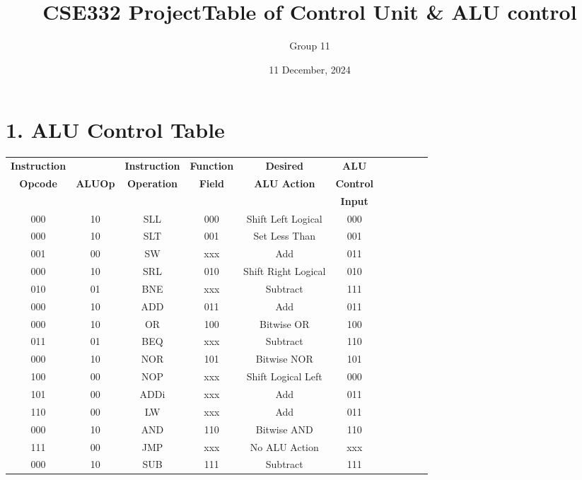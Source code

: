 \documentclass[12pt, onecolumn]{report}
\title{CSE332 Project}
\author{Group 11}
\date{11 December, 2024}
\begin{document}
\maketitle

\hfill

\begin{center}
  \title{\LARGE Table of Control Unit \& ALU control}  
\end{center}

\section*{1. ALU Control Table}

\begin{table}[h!]
\centering
\begin{tabular}{|c|c|c|c|c|c|c|c|c|c|c|}
\hline
\textbf{Instruction} & & \textbf{Instruction} & \textbf{Function} & \textbf{Desired} & \textbf{ALU} \\

\textbf{Opcode} & \textbf{ALUOp}  & \textbf{Operation} & \textbf{Field} & \textbf{ALU Action} & \textbf{Control}\\
&  & &  & & \textbf{Input}\\
\hline
000 & 10 & SLL & 000 & Shift Left Logical & 000 \\\hline
000 & 10 & SLT & 001 & Set Less Than & 001 \\\hline
001 & 00 & SW & xxx & Add & 011 \\\hline
000 & 10 & SRL & 010 & Shift Right Logical & 010 \\\hline
010 & 01 & BNE & xxx & Subtract & 111 \\\hline
000 & 10 & ADD & 011 & Add & 011 \\\hline
000 & 10 & OR & 100 & Bitwise OR & 100 \\\hline
011 & 01 & BEQ & xxx & Subtract & 110 \\\hline
000 & 10 & NOR & 101 & Bitwise NOR & 101 \\\hline
100 & 00 & NOP & xxx & Shift Logical Left & 000 \\\hline
101 & 00 & ADDi & xxx & Add & 011 \\\hline
110 & 00 & LW & xxx & Add & 011 \\\hline
000 & 10 & AND & 110 & Bitwise AND & 110 \\\hline
111 & 00 & JMP & xxx & No ALU Action & xxx \\\hline
000 & 10 & SUB & 111 & Subtract & 111 \\
\hline
\end{tabular}
\end{table}
\hfill
\end{document}
